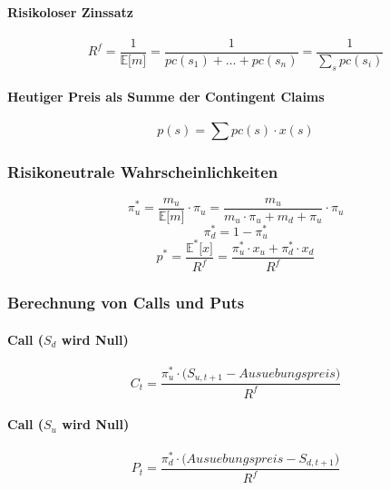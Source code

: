 \paragraph{Risikoloser Zinssatz}
\begin{equation}
	R^f = \frac{1}{\mathbb{E} \big\lbrack m \big\rbrack} = \frac{1}{pc(s_1) + \dots + pc(s_n)} = \frac{1}{\sum_s pc(s_i)}
\end{equation}
\paragraph{Heutiger Preis als Summe der Contingent Claims}
\begin{equation}
	p(s) = \sum pc(s)\cdot x(s)
\end{equation}

\subsubsection{Risikoneutrale Wahrscheinlichkeiten}
\begin{equation}
	\pi^*_u = \frac{m_u}{\mathbb{E} \big\lbrack m \big\rbrack} \cdot \pi_u = \frac{m_u}{m_u \cdot \pi_u + m_d + \pi_u} \cdot \pi_u
\end{equation}
\begin{equation}
	\pi^*_d = 1 - \pi^*_u
\end{equation}
\begin{equation}
	p^* = \frac{\mathbb{E}^* \big\lbrack x \big\rbrack}{R^f} = \frac{\pi^*_u \cdot x_u + \pi^*_d \cdot x_d}{R^f} \label{eq:prn}
\end{equation}

\subsubsection{Berechnung von Calls und Puts}
\paragraph{Call (\(S_d\) wird Null)}
\begin{equation}
	C_t = \frac{\pi^*_u \cdot \big( S_{u,t+1} - Ausuebungspreis \big)}{R^f}
\end{equation}
\paragraph{Call (\(S_u\) wird Null)}
\begin{equation}
	P_t = \frac{\pi^*_d \cdot \big( Ausuebungspreis - S_{d,t+1} \big)}{R^f}
\end{equation}


